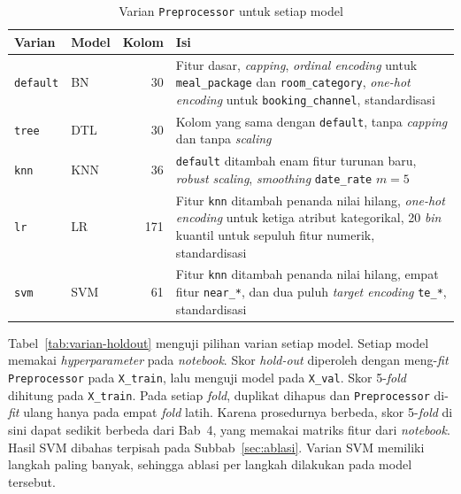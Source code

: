 \begin{table}[H]
	\centering
	\caption{Varian \texttt{Preprocessor} untuk setiap model}
	\label{tab:varian-prep}
	\small
	\begin{tabular}{l l r p{7.6cm}}
		\toprule
		\textbf{Varian} & \textbf{Model} & \textbf{Kolom} & \textbf{Isi} \\
		\midrule
		\texttt{default} & BN & 30 & Fitur dasar, \textit{capping}, \textit{ordinal encoding} untuk \texttt{meal\_package} dan \texttt{room\_category}, \textit{one-hot encoding} untuk \texttt{booking\_channel}, standardisasi \\
		\texttt{tree} & DTL & 30 & Kolom yang sama dengan \texttt{default}, tanpa \textit{capping} dan tanpa \textit{scaling} \\
		\texttt{knn} & KNN & 36 & \texttt{default} ditambah enam fitur turunan baru, \textit{robust scaling}, \textit{smoothing} \texttt{date\_rate} $m=5$ \\
		\texttt{lr} & LR & 171 & Fitur \texttt{knn} ditambah penanda nilai hilang, \textit{one-hot encoding} untuk ketiga atribut kategorikal, 20 \textit{bin} kuantil untuk sepuluh fitur numerik, standardisasi \\
		\texttt{svm} & SVM & 61 & Fitur \texttt{knn} ditambah penanda nilai hilang, empat fitur \texttt{near\_*}, dan dua puluh \textit{target encoding} \texttt{te\_*}, standardisasi \\
		\bottomrule
	\end{tabular}
\end{table}

Tabel~\ref{tab:varian-holdout} menguji pilihan varian setiap model. Setiap
model memakai \textit{hyperparameter} pada \textit{notebook}. Skor
\textit{hold-out} diperoleh dengan meng-\textit{fit} \texttt{Preprocessor} pada
\texttt{X\_train}, lalu menguji model pada \texttt{X\_val}. Skor 5-\textit{fold}
dihitung pada \texttt{X\_train}. Pada setiap \textit{fold}, duplikat dihapus dan
\texttt{Preprocessor} di-\textit{fit} ulang hanya pada empat \textit{fold} latih.
Karena prosedurnya berbeda, skor 5-\textit{fold} di sini dapat sedikit berbeda dari
Bab~4, yang memakai matriks fitur dari \textit{notebook}. Hasil SVM dibahas
terpisah pada Subbab~\ref{sec:ablasi}. Varian SVM memiliki langkah paling banyak,
sehingga ablasi per langkah dilakukan pada model tersebut.

